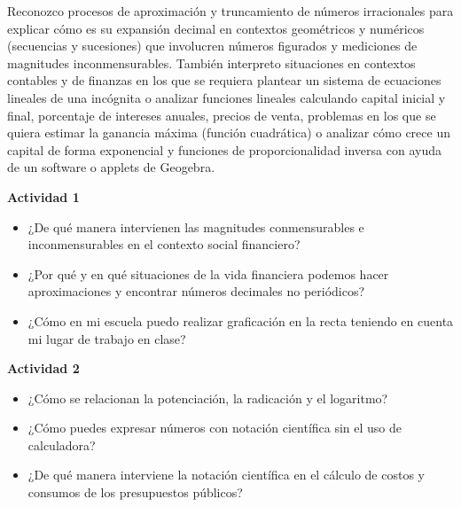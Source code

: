 \documentclass[12pt,a4paper]{article}
\begin{document}
\begin{tcolorbox}[colback=fondorosa,colframe=rojoclaro,title=\textbf{META DE APRENDIZAJE N°28:},fonttitle=\bfseries]
Reconozco procesos de aproximación y truncamiento de números irracionales para explicar cómo es su expansión decimal en contextos geométricos y numéricos (secuencias y sucesiones) que involucren números figurados y mediciones de magnitudes inconmensurables. También interpreto situaciones en contextos contables y de finanzas en los que se requiera plantear un sistema de ecuaciones lineales de una incógnita o analizar funciones lineales calculando capital inicial y final, porcentaje de intereses anuales, precios de venta, problemas en los que se quiera estimar la ganancia máxima (función cuadrática) o analizar cómo crece un capital de forma exponencial y funciones de proporcionalidad inversa con ayuda de un software o applets de Geogebra.
\end{tcolorbox}

\vspace{0.5cm}

\begin{tcolorbox}[colback=fondoazul,colframe=azuloscuro,title=\textbf{PREGUNTAS ESENCIALES:},fonttitle=\bfseries]
\textbf{Actividad 1}
\begin{itemize}
\item ¿De qué manera intervienen las magnitudes conmensurables e inconmensurables en el contexto social financiero?
\item ¿Por qué y en qué situaciones de la vida financiera podemos hacer aproximaciones y encontrar números decimales no periódicos?
\item ¿Cómo en mi escuela puedo realizar graficación en la recta teniendo en cuenta mi lugar de trabajo en clase?
\end{itemize}

\textbf{Actividad 2}
\begin{itemize}
\item ¿Cómo se relacionan la potenciación, la radicación y el logaritmo?
\item ¿Cómo puedes expresar números con notación científica sin el uso de calculadora?
\item ¿De qué manera interviene la notación científica en el cálculo de costos y consumos de los presupuestos públicos?
\end{itemize}
\end{tcolorbox}

\end{document}
